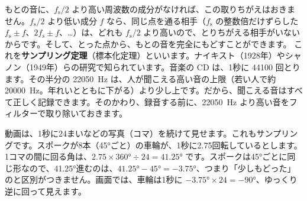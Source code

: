 \begin{bkfigure}
\label{bk:9-4:fig-alias}
\end{bkfigure}

もとの音に、$f_{\mathrm s}/2$ より高い周波数の成分がなければ、この取りちがえはおきません。$f_{\mathrm s}/2$ より低い成分 $f$ なら、同じ点を通る相手（$f_{\mathrm s}$ の整数倍だけずらした $f_{\mathrm s}\pm f$、$2f_{\mathrm s}\pm f$、…）は、どれも $f_{\mathrm s}/2$ より高いので、とりちがえる相手がいないからです。そして、とった点から、もとの音を完全にもどすことができます。
これを\textbf{サンプリング定理}（標本化定理）といいます。ナイキスト（1928年）やシャノン（1949年）らの研究で知られています。音楽の CD は、1秒に \num{44100} 回とります。その半分の \qty{22050}{Hz} は、人が聞こえる高い音の上限（若い人で約 \qty{20000}{Hz}。年れいとともに下がる）より少し上です。だから、聞こえる音はすべて正しく記録できます。そのかわり、録音する前に、\qty{22050}{Hz} より高い音をフィルターで取り除いておきます。

動画は、1秒に24まいなどの写真（コマ）を続けて見せます。これもサンプリングです。スポークが8本（45°ごと）の車輪が、1秒に2.75回転しているとします。1コマの間に回る角は、$2.75\times360°\div24=41.25°$ です。スポークは45°ごとに同じ形なので、41.25°進むのは、$41.25°-45°=-3.75°$、つまり「少しもどった」のと区別がつきません。画面では、車輪は1秒に $-3.75°\times24=-90°$、ゆっくり逆に回って見えます。

